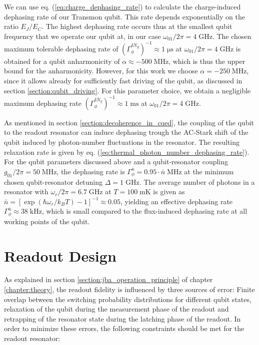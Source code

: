 We can use eq. (\ref{eq:charge_dephasing_rate}) to calculate the charge-induced dephasing rate of our Transmon qubit. This rate depends exponentially on the ratio $E_J/E_C$. The highest dephasing rate occurs thus at the smallest qubit frequency that we operate our qubit at, in our case $\omega_{01}/2\pi=4\;\mathrm{GHz}$. The chosen maximum tolerable dephasing rate of $\left(\Gamma_{\phi}^{\delta N_g}\right)^{-1} \approx 1\;\mathrm{\mu s}$ at $\omega_{01}/2\pi=4\;\mathrm{GHz}$ is obtained for a qubit anharmonicity of $\alpha\approx-500\;\mathrm{MHz}$, which is thus the upper bound for the anharmonicity. However, for this work we choose $\alpha=-250\;\mathrm{MHz}$, since it allows already for sufficiently fast driving of the qubit, as discussed in section \ref{section:qubit_driving}. For this parameter choice, we obtain a negligible maximum dephasing rate $\left(\Gamma_{\phi}^{\delta N_g}\right)^{-1} \approx 1\;\mathrm{ms}$ at $\omega_{01}/2\pi=4\;\mathrm{GHz}$. 

\smallskip

As mentioned in section \ref{section:decoherence_in_cqed}, the coupling of the qubit to the readout resonator can induce dephasing trough the AC-Stark shift of the qubit induced by photon-number fluctuations in the resonator. The resulting relaxation rate is given by eq. (\ref{eq:thermal_photon_number_dephasing_rate}). For the qubit parameters discussed above and a qubit-resonator coupling $g_{01}/2\pi=50\;\mathrm{MHz}$, the dephasing rate is $\Gamma_\phi^{\bar{n}}= 0.95\cdot{\bar{n}} \;\mathrm{MHz}$ at the minimum chosen qubit-resonator detuning $\Delta = 1 \;\mathrm{GHz}$. The average number of photons in a resonator with $\omega_{r}/2\pi = 6.7\;\mathrm{GHz}$ at $T=100\;\mathrm{mK}$ is given as $\bar{n} = [\exp{(\hbar\omega_r/k_B T)-1}]^{-1} \approx 0.05$, yielding an effective dephasing rate $\Gamma_\phi^{\bar{n}}\approx 38\;\mathrm{kHz}$, which is small compared to the flux-induced dephasing rate at all working points of the qubit.

\section{Readout Design}

As explained in section \ref{section:jba_operation_principle} of chapter \ref{chapter:theory}, the readout fidelity is influenced by three sources of error: Finite overlap between the switching probability distributions for different qubit states, relaxation of the qubit during the measurement phase of the readout and retrapping of the resonator state during the latching phase of the readout. In order to minimize these errors, the following constraints should be met for the readout resonator:

